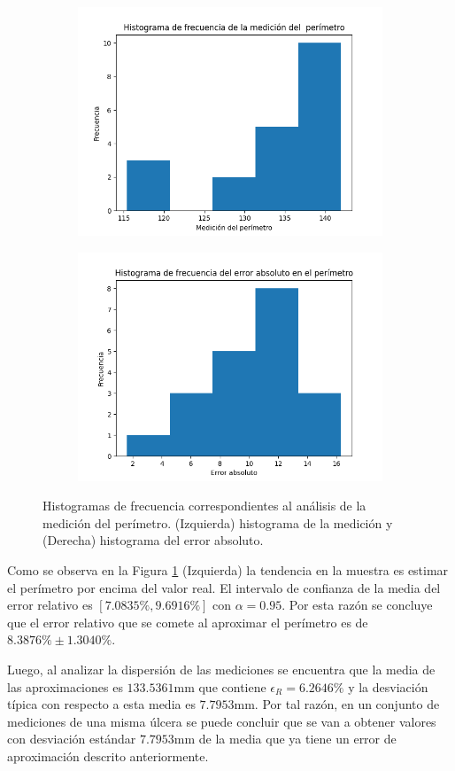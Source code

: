 \begin{figure}[ht]
	\centering
	\begin{subfigure}
		\centering
		\includegraphics[width=.49\linewidth]{./Graphics/histP.png}
	\end{subfigure}
	\begin{subfigure}
		\centering
		\includegraphics[width=.49\linewidth]{./Graphics/histPEA.png}
	\end{subfigure}
	\caption{Histogramas de frecuencia correspondientes al análisis de la medición del perímetro. (Izquierda) histograma de la medición y (Derecha) histograma del error absoluto.}
	\label{fig:histP}
\end{figure}

Como se observa en la Figura \ref{fig:histP} (Izquierda) la tendencia en la muestra es estimar el perímetro por encima del valor real. El intervalo de confianza de la media del error relativo es $[7.0835\%, 9.6916\%]$ con $\alpha =0.95$. Por esta razón se concluye que el error relativo que se comete al aproximar el perímetro es de $8.3876\% \pm 1.3040\%$. 

Luego, al analizar la dispersión de las mediciones se encuentra que la media de las aproximaciones es $133.5361\text{mm}$ que contiene $\epsilon_R=6.2646\%$ y la desviación típica con respecto a esta media es $7.7953\text{mm}$. Por tal razón, en un conjunto de mediciones de una misma úlcera se puede concluir que se van a obtener valores con desviación estándar $7.7953\text{mm}$ de la media que ya tiene un error de aproximación descrito anteriormente.

